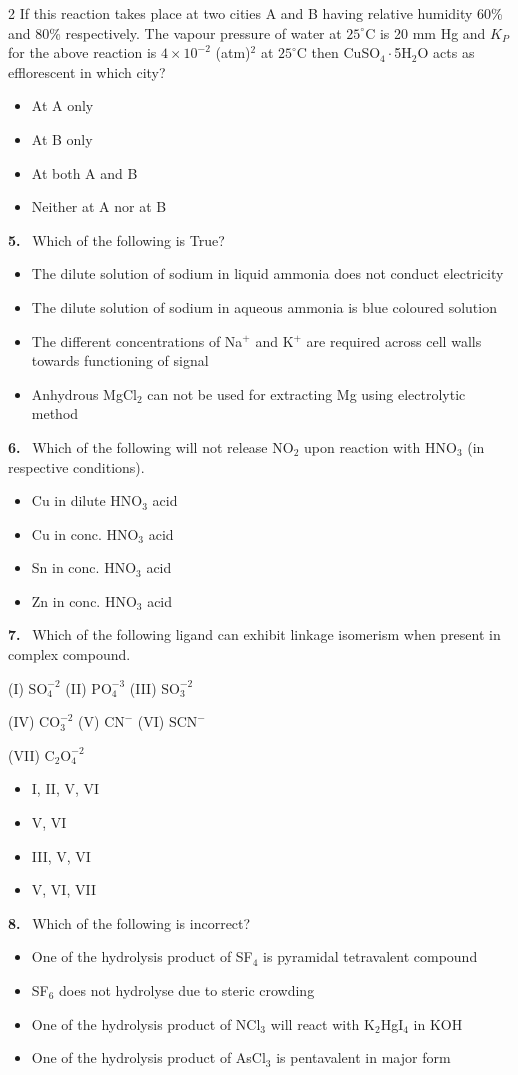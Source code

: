 \documentclass[10pt]{extarticle}
\newcommand{\qn}[1]{\par\smallskip\noindent\textbf{#1.}~}
\newenvironment{qoptions}{\begin{itemize}[leftmargin=1.8em,itemsep=1pt,topsep=2pt,label={}]}{\end{itemize}}
\newcommand{\opt}[2]{\item[(#1)] #2}
\begin{document}
\begin{multicols}{2}
If this reaction takes place at two cities A and B having relative humidity 60\% and 80\% respectively. The vapour pressure of water at $25^\circ$C is 20 mm Hg and $K_P$ for the above reaction is $4\times10^{-2}$ (atm)$^2$ at $25^\circ$C then CuSO$_4\cdot$5H$_2$O acts as efflorescent in which city?
\begin{qoptions}
\opt{A}{At A only}
\opt{B}{At B only}
\opt{C}{At both A and B}
\opt{D}{Neither at A nor at B}
\end{qoptions}

\qn{5} Which of the following is True?
\begin{qoptions}
\opt{A}{The dilute solution of sodium in liquid ammonia does not conduct electricity}
\opt{B}{The dilute solution of sodium in aqueous ammonia is blue coloured solution}
\opt{C}{The different concentrations of Na$^+$ and K$^+$ are required across cell walls towards functioning of signal}
\opt{D}{Anhydrous MgCl$_2$ can not be used for extracting Mg using electrolytic method}
\end{qoptions}

\qn{6} Which of the following will not release NO$_2$ upon reaction with HNO$_3$ (in respective conditions).
\begin{qoptions}
\opt{A}{Cu in dilute HNO$_3$ acid}
\opt{B}{Cu in conc. HNO$_3$ acid}
\opt{C}{Sn in conc. HNO$_3$ acid}
\opt{D}{Zn in conc. HNO$_3$ acid}
\end{qoptions}

\qn{7} Which of the following ligand can exhibit linkage isomerism when present in complex compound.

(I) $\mathrm{SO_4^{-2}}$ \quad (II) $\mathrm{PO_4^{-3}}$ \quad (III) $\mathrm{SO_3^{-2}}$

(IV) $\mathrm{CO_3^{-2}}$ \quad (V) $\mathrm{CN^-}$ \quad (VI) $\mathrm{SCN^-}$

(VII) $\mathrm{C_2O_4^{-2}}$
\begin{qoptions}
\opt{A}{I, II, V, VI}
\opt{B}{V, VI}
\opt{C}{III, V, VI}
\opt{D}{V, VI, VII}
\end{qoptions}

\qn{8} Which of the following is incorrect?
\begin{qoptions}
\opt{A}{One of the hydrolysis product of SF$_4$ is pyramidal tetravalent compound}
\opt{B}{SF$_6$ does not hydrolyse due to steric crowding}
\opt{C}{One of the hydrolysis product of NCl$_3$ will react with K$_2$HgI$_4$ in KOH}
\opt{D}{One of the hydrolysis product of AsCl$_3$ is pentavalent in major form}
\end{qoptions}


\end{multicols}
\end{document}
